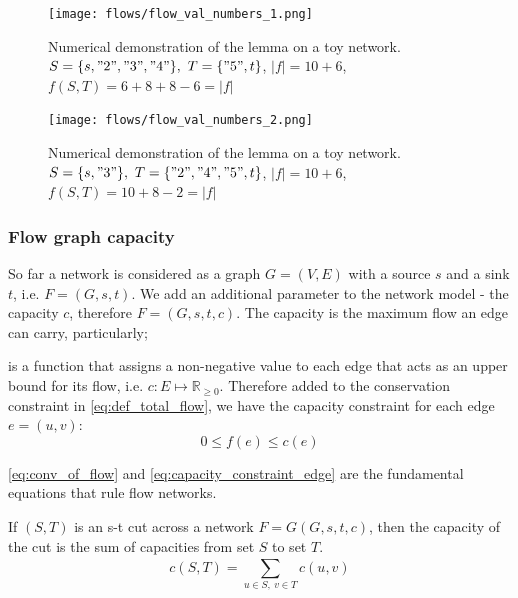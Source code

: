 \documentclass[a4paper]{article}
\begin{document}
\begin{multicols}{2}
\begin{figure}[H]
	\centering %
	\texttt{[image: flows/flow\_val\_numbers\_1.png]}
	\captionsetup{width=0.4\textwidth}
    \caption{Numerical demonstration of the lemma on a toy network. $S = \{s, "2", "3", "4"\},\ T=\{"5", t \}$, $\left|f \right| = 10+6$, $f(S,T) = 6 + 8 + 8 - 6 = \left| f \right|$}
\end{figure}

\columnbreak
\begin{figure}[H]
	\centering %
	\texttt{[image: flows/flow\_val\_numbers\_2.png]}
	\captionsetup{width=0.4\textwidth}
        \caption{Numerical demonstration of the lemma on a toy network. $S = \{s, "3"\},\ T=\{"2", "4", "5", t \}$, $\left|f \right| = 10+6$, $f(S,T) = 10 + 8 - 2 = \left| f \right|$}
\end{figure}
\end{multicols}



\subsubsection{Flow graph capacity}

So far a network is considered as a graph $G=(V,E)$ with a source $s$ and a sink $t$, i.e. $F=(G,s,t)$. We add an additional parameter to the network model - the capacity $c$, therefore $F=(G,s,t,c)$. The capacity is the maximum flow an edge can carry, particularly;
\begin{definition}
 is a function that assigns a non-negative value to each edge that acts as an upper bound for its flow, i.e. $c:E\mapsto \mathbb{R}_{\geq 0}$. Therefore added to the conservation constraint in \eqref{eq:def_total_flow}, we have the capacity constraint for each edge $e=(u,v)$:
\begin{equation}
    \label{eq:capacity_constraint_edge}
    0 \leq f(e) \leq c(e)
\end{equation}
\end{definition}

\eqref{eq:conv_of_flow} and \eqref{eq:capacity_constraint_edge} are the fundamental equations that rule flow networks.

\begin{lemma}
If $(S,T)$ is an s-t cut across a network $F=G(G,s,t,c)$, then the capacity of the cut is the sum of capacities from set $S$ to set $T$.
\begin{equation}
    c(S,T) = \sum_{u\in S, \ v \in T}^{} c(u,v)
    \label{eq:def_cut_cap}
\end{equation}
\end{lemma}
\end{document}
